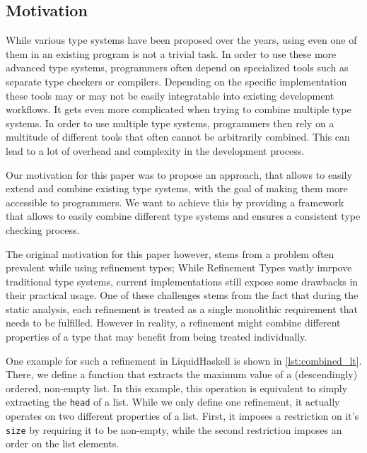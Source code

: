 \subsection{Motivation}
\label{ssec:motivation}

While various type systems have been proposed over the years, using even one of them in an existing program is not a trivial task. In order to use these more advanced type systems, programmers often depend on specialized tools such as separate type checkers or compilers. Depending on the specific implementation these tools may or may not be easily integratable into existing development workflows. It gets even more complicated when trying to combine multiple type systems. In order to use multiple type systems, programmers then rely on a multitude of different tools that often cannot be arbitrarily combined. This can lead to a lot of overhead and complexity in the development process.

Our motivation for this paper was to propose an approach, that allows to easily extend and combine existing type systems, with the goal of making them more accessible to programmers. We want to achieve this by providing a framework that allows to easily combine different type systems and ensures a consistent type checking process.

The original motivation for this paper however, stems from a problem often prevalent while using refinement types; While Refinement Types vastly imrpove traditional type systems, current implementations still expose some drawbacks in their practical usage. One of these challenges stems from the fact that during the static analysis, each refinement is treated as a single monolithic requirement that needs to be fulfilled. However in reality, a refinement might combine different properties of a type that may benefit from being treated individually.

One example for such a refinement in LiquidHaskell is shown in \ref{lst:combined_lt}. There, we define a function that extracts the maximum value of a (descendingly) ordered, non-empty list. In this example, this operation is equivalent to simply extracting the \texttt{head} of a list. While we only define one refinement, it actually operates on two different properties of a list. First, it imposes a restriction on it's \texttt{size} by requiring it to be non-empty, while the second restriction imposes an order on the list elements.



